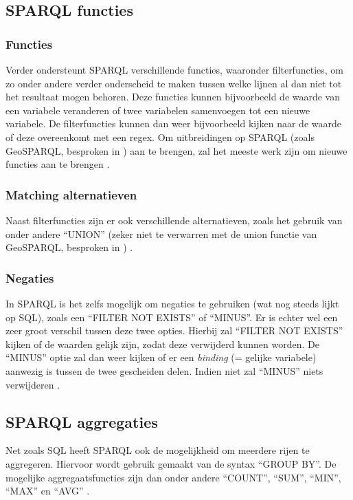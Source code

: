 \subsection{SPARQL functies}
\subsubsection{Functies}
Verder ondersteunt SPARQL verschillende functies, waaronder filterfuncties, om zo onder andere verder onderscheid te maken tussen welke lijnen al dan niet tot het resultaat mogen behoren. Deze functies kunnen bijvoorbeeld de waarde van een variabele veranderen of twee variabelen samenvoegen tot een nieuwe variabele. De filterfuncties kunnen dan weer bijvoorbeeld kijken naar de waarde of deze overeenkomt met een regex. Om uitbreidingen op SPARQL (zoals GeoSPARQL, besproken in ) aan te brengen, zal het meeste werk zijn om nieuwe functies aan te brengen \cite{sparql2013querylanguage}.

\subsubsection{Matching alternatieven}
Naast filterfuncties zijn er ook verschillende alternatieven, zoals het gebruik van onder andere ``UNION'' (zeker niet te verwarren met de union functie van GeoSPARQL, besproken in ) \cite{sparql2013querylanguage}.

\subsubsection{Negaties}
In SPARQL is het zelfs mogelijk om negaties te gebruiken (wat nog steeds lijkt op SQL), zoals een ``FILTER NOT EXISTS'' of ``MINUS''. Er is echter wel een zeer groot verschil tussen deze twee opties. Hierbij zal ``FILTER NOT EXISTS'' kijken of de waarden gelijk zijn, zodat deze verwijderd kunnen worden. De ``MINUS'' optie zal dan weer kijken of er een \textit{binding} (= gelijke variabele) aanwezig is tussen de twee gescheiden delen. Indien niet zal ``MINUS'' niets verwijderen \cite{sparql2013querylanguage}.

\subsection{SPARQL aggregaties}
Net zoals SQL heeft SPARQL ook de mogelijkheid om meerdere rijen te aggregeren. Hiervoor wordt gebruik gemaakt van de syntax ``GROUP BY''. De mogelijke aggregaatsfuncties zijn dan onder andere ``COUNT'', ``SUM'', ``MIN'', ``MAX'' en ``AVG'' \cite{sparql2013querylanguage}.

